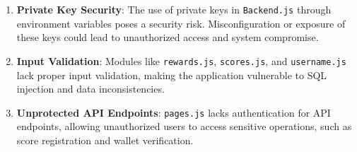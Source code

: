 \documentclass[../main.tex]{subfiles}
\begin{document}
\begin{enumerate}
    \item \textbf{Private Key Security}: The use of private keys in \texttt{Backend.js} through environment variables poses a security risk. Misconfiguration or exposure of these keys could lead to unauthorized access and system compromise.
%
    
    \item \textbf{Input Validation}: Modules like \texttt{rewards.js}, \texttt{scores.js}, and \texttt{username.js} lack proper input validation, making the application vulnerable to SQL injection and data inconsistencies.

   \item \textbf{Unprotected API Endpoints}: \texttt{pages.js} lacks authentication for API endpoints, allowing unauthorized users to access sensitive operations, such as score registration and wallet verification.


\end{enumerate}
\end{document}
